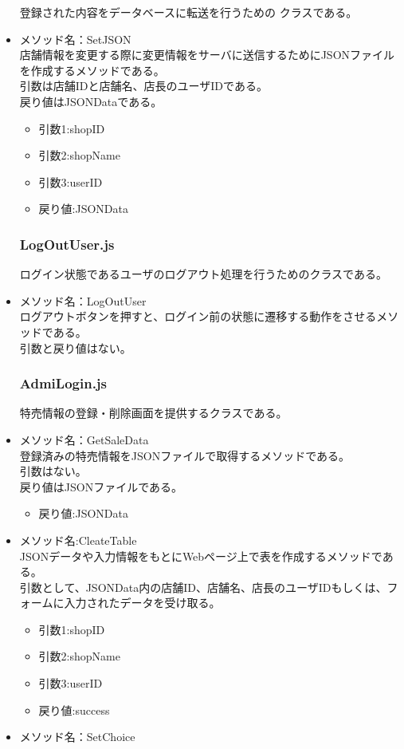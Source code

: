 \documentclass[a4j]{jarticle}
\begin{document}
\begin{itemize}
登録された内容をデータベースに転送を行うための
クラスである。

\item メソッド名：SetJSON\\

店舗情報を変更する際に変更情報をサーバに送信するためにJSONファイルを作成するメソッドである。\\
引数は店舗IDと店舗名、店長のユーザIDである。\\
戻り値はJSONDataである。
	\begin{itemize}
		\item 引数1:shopID
		\item 引数2:shopName
		\item 引数3:userID
		\item 戻り値:JSONData
	\end{itemize}
\subsubsection{LogOutUser.js}

ログイン状態であるユーザのログアウト処理を行うためのクラスである。
%
\item メソッド名：LogOutUser\\

ログアウトボタンを押すと、ログイン前の状態に遷移する動作をさせるメソッドである。\\
引数と戻り値はない。
%
\subsubsection{AdmiLogin.js}

特売情報の登録・削除画面を提供するクラスである。
\item メソッド名：GetSaleData\\

登録済みの特売情報をJSONファイルで取得するメソッドである。\\
引数はない。\\
戻り値はJSONファイルである。
	\begin{itemize}
		\item 戻り値:JSONData
	\end{itemize}


\item メソッド名:CleateTable\\

JSONデータや入力情報をもとにWebページ上で表を作成するメソッドである。\\
引数として、JSONData内の店舗ID、店舗名、店長のユーザIDもしくは、フォームに入力されたデータを受け取る。
	\begin{itemize}
		\item 引数1:shopID
		\item 引数2:shopName
		\item 引数3:userID
		\item 戻り値:success
	\end{itemize}
\item メソッド名：SetChoice\\


\end{itemize}
\end{document}
